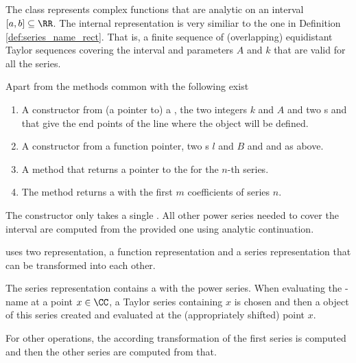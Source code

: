 	\subsection{\anarect}
		The class \anarect represents complex functions that are analytic on an interval $[a, b] \subseteq \RR$.
		The internal representation is very similiar to the one in Definition \ref{def:series_name_rect}.
		That is, a finite sequence of (overlapping) equidistant Taylor sequences covering the interval and parameters $A$ and $k$ 
		that are valid for all the series.

		Apart from the methods common with \baana the following exist
		\begin{enumerate}
      \item A constructor from (a pointer to) a \powerseries, the two integers $k$ and $A$ and two {\real}s  and 
            that give the end points of the line where the \anarect object will be defined.
      \item A constructor from a function pointer, two s $l$ and $B$ and  and  as above.
      \item A method  that returns a pointer to the \powerseries for the $n$-th series.
      \item The method  returns a \poly with the first $m$ coefficients of series $n$. 
		\end{enumerate}
		The constructor only takes a single \powerseries.
		All other power series needed to cover the interval are computed from the provided one using analytic 
		continuation.  

		\anarect uses two representation, a function representation  and a series representation  that can be transformed into each other.

		The series representation  contains a  with the power series.
		When evaluating the -name at a point $x \in \CC$, 
		a Taylor series containing $x$ is chosen and then a \baana object of this series created and evaluated at 
		the (appropriately shifted) point $x$. 

		For other operations, the according transformation of the first series is computed and then the 
		other series are computed from that.    
